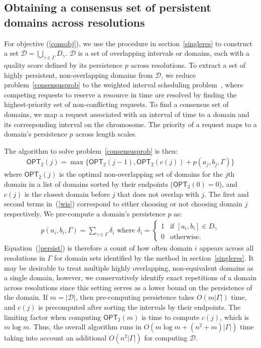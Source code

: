 \documentclass[12pt]{cmuthesis}
\begin{document}
  \subsection{Obtaining a consensus set of persistent domains across resolutions}
  \label{consensusalg}
  For objective (\ref{consobj}), we use the procedure in section~\ref{singleres} to construct a set $\mathcal{D} = \bigcup_{\gamma \in \Gamma} D_{\gamma}$.  $\mathcal{D}$ is a set of overlapping intervals or domains, each with a quality score defined by its persistence $p$ across resolutions. To extract a set of highly persistent, non-overlapping domains from $\mathcal{D}$, we reduce  problem~\ref{consensusprob} to the weighted interval scheduling problem~\cite{Kleinberg2005}, where competing requests to reserve a resource in time are resolved by finding the highest-priority set of non-conflicting requests. To find a consensus set of domains, we map a request associated with an interval of time to a domain and its corresponding interval on the chromosome. The priority of a request maps to a domain's persistence $p$ across length scales.

  The algorithm to solve problem~\ref{consensusprob} is then:
  \begin{align}
  \label{wis}
  \textsf{OPT}_2(j) = \max\{\textsf{OPT}_2(j-1), \textsf{OPT}_2(c(j)) + p(a_j,b_j,\Gamma) \}
  \end{align}
  where $\textsf{OPT}_2(j)$ is the optimal non-overlapping set of domains for the $j$th domain in a list of domains sorted by their endpoints ($\textsf{OPT}_2(0) = 0$), and $c(j)$ is the closest domain before $j$ that does not overlap with $j$.  The first and second terms in~(\ref{wis}) correspond to either choosing or not choosing domain $j$ respectively.
  We pre-compute a domain's persistence $p$ as:
  \begin{align}
  \label{persist}
  p(a_i,b_i,\Gamma) = \sum_{\gamma \in \Gamma} \delta_i \text{ where }
  \delta_i = \begin{cases}
  1 & \text{if } [a_i,b_i] \in D_{\gamma} \\ 0 & \text{otherwise.}
  \end{cases}
  \end{align}
  Equation~(\ref{persist}) is therefore a count of how often domain $i$ appears across all resolutions in $\Gamma$ for domain sets identified by the method in section~\ref{singleres}. It may be desirable to treat multiple highly overlapping, non-equivalent domains as a single domain, however, we conservatively identify exact repetitions of a domain across resolutions since this setting serves as a lower bound on the persistence of the domain. If $m=|\mathcal{D}|$, then pre-computing persistence takes $O(m|\Gamma|)$ time, and $c(j)$ is precomputed after sorting the intervals by their endpoints. The limiting factor when computing $\textsf{OPT}_2(m)$ is time to compute $c(j)$, which is $m\log m$. Thus, the overall algorithm runs in $O(m\log m + (n^2+m)|\Gamma|)$ time taking into account an additional $O(n^2|\Gamma|)$ for computing $\mathcal{D}$.
\end{document}
